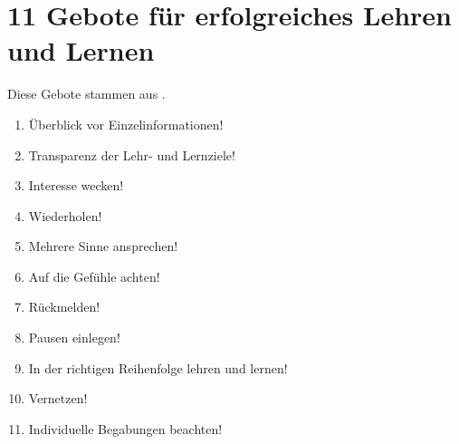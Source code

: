 \section{11 Gebote für erfolgreiches Lehren und Lernen}

Diese Gebote stammen aus \cite{kopf}.

\begin{enumerate}
  \item Überblick vor Einzelinformationen!
  \item Transparenz der Lehr- und Lernziele!
  \item Interesse wecken!
  \item Wiederholen!
  \item Mehrere Sinne ansprechen!
  \item Auf die Gefühle achten!
  \item Rückmelden!
  \item Pausen einlegen!
  \item In der richtigen Reihenfolge lehren und lernen!
  \item Vernetzen!
  \item Individuelle Begabungen beachten!
\end{enumerate}